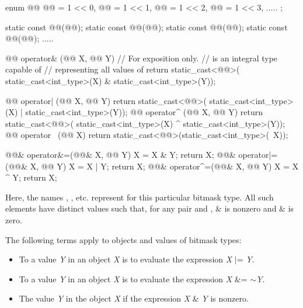 \begin{codeblock}
enum @@ {
  @@ = 1 << 0, @@ = 1 << 1, @@ = 1 << 2, @@ = 1 << 3, .....
};

static const @@(@@);
static const @@(@@);
static const @@(@@);
static const @@(@@);
  .....

@@  operator& (@@  X, @@ Y)
	// For exposition only.
	//  is an integral type capable of
	// representing all values of 
	{ return static_cast<@@>(
		     static_cast<int_type>(X) &
		     static_cast<int_type>(Y)); }

@@  operator| (@@  X, @@ Y)
	{ return static_cast<@@>(
		     static_cast<int_type>(X) |
		     static_cast<int_type>(Y)); }
@@  operator^ (@@  X, @@ Y)
	{ return static_cast<@@>(
		     static_cast<int_type>(X) ^
		     static_cast<int_type>(Y)); }
@@  operator~ (@@  X)
	{ return static_cast<@@>(static_cast<int_type>(~X)); }

@@& operator&=(@@& X, @@ Y)
	{ X = X & Y; return X; }
@@& operator|=(@@& X, @@ Y)
	{ X = X | Y; return X; }
@@& operator^=(@@& X, @@ Y)
	{ X = X ^ Y; return X; }
\end{codeblock}

\pnum
Here, the names , , etc. represent
for this particular bitmask type.
%
All such elements have distinct values such that, for any pair 
and ,  \&  is nonzero and
 \&  is zero.

\pnum
The following terms apply to objects and values of
bitmask types:

\begin{itemize}
\item
To
a value \textit{Y} in an object \textit{X}
is to evaluate the expression \textit{X} $|$= \textit{Y}.
\item
To
a value \textit{Y} in an object
\textit{X} is to evaluate the expression \textit{X} \&= $\sim$\textit{Y}.
\item
The value \textit{Y}
in the object
\textit{X} if the expression \textit{X} \& \textit{Y} is nonzero.
\end{itemize}

